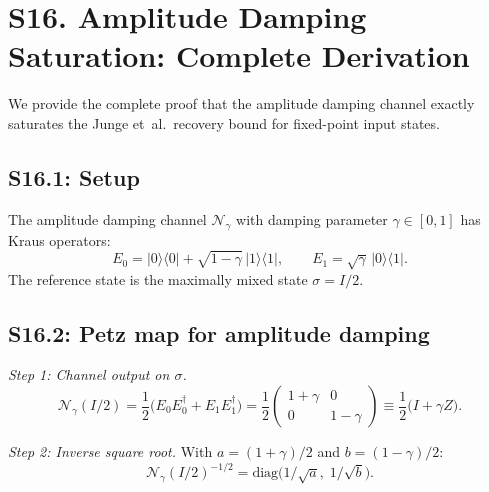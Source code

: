 \documentclass[prl,twocolumn,superscriptaddress,longbibliography]{revtex4-2}
\newcommand{\chan}{\mathcal{N}}
\newcommand{\ket}[1]{|#1\rangle}
\newcommand{\bra}[1]{\langle#1|}
\begin{document}
\section{S16. Amplitude Damping Saturation: Complete Derivation}
\label{sec:amp_damp}

We provide the complete proof that the amplitude damping channel
exactly saturates the Junge et~al.\ recovery bound for fixed-point
input states.

\subsection{S16.1: Setup}

The amplitude damping channel $\chan_\gamma$ with damping parameter
$\gamma \in [0,1]$ has Kraus operators:
\begin{equation}
E_0 = \ket{0}\!\bra{0} + \sqrt{1-\gamma}\,\ket{1}\!\bra{1},
\qquad
E_1 = \sqrt{\gamma}\,\ket{0}\!\bra{1}.
\end{equation}
The reference state is the maximally mixed state $\sigma = I/2$.

\subsection{S16.2: Petz map for amplitude damping}

\emph{Step 1: Channel output on $\sigma$.}
\begin{equation}
\chan_\gamma(I/2) = \frac{1}{2}\big(E_0 E_0^\dagger + E_1 E_1^\dagger\big)
= \frac{1}{2}\begin{pmatrix} 1+\gamma & 0 \\ 0 & 1-\gamma \end{pmatrix}
\equiv \frac{1}{2}\big(I + \gamma Z\big).
\end{equation}

\emph{Step 2: Inverse square root.}
With $a = (1+\gamma)/2$ and $b = (1-\gamma)/2$:
\begin{equation}
\chan_\gamma(I/2)^{-1/2}
= \mathrm{diag}\!\big(1/\sqrt{a},\; 1/\sqrt{b}\big).
\end{equation}
\end{document}
